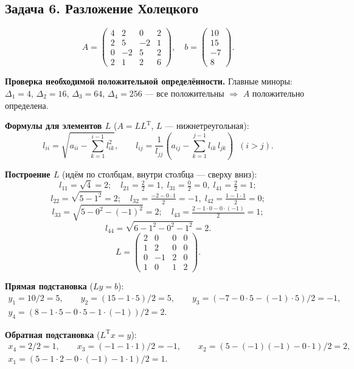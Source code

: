 \documentclass{article}
\begin{document}
\subsection*{Задача 6. Разложение Холецкого}
$$A = \begin{pmatrix} 4 & 2 & 0 & 2 \\ 2 & 5 & -2 & 1 \\ 0 & -2 & 5 & 2 \\ 2 & 1 & 2 & 6 \end{pmatrix}, \quad b = \begin{pmatrix} 10 \\ 15 \\ -7 \\ 8 \end{pmatrix}.$$

\textbf{Проверка необходимой положительной определённости.} Главные миноры: $\Delta_1=4$, $\Delta_2=16$, $\Delta_3=64$, $\Delta_4=256$ --- все положительны $\Rightarrow$ $A$ положительно определена.

\textbf{Формулы для элементов $L$} ($A = LL^\text{T}$, $L$ --- нижнетреугольная):
$$l_{ii} = \sqrt{a_{ii} - \sum_{k=1}^{i-1} l_{ik}^2}, \qquad l_{ij} = \frac{1}{l_{jj}}\left(a_{ij} - \sum_{k=1}^{j-1} l_{ik}\, l_{jk}\right) \;\; (i > j).$$

\textbf{Построение $L$} (идём по столбцам, внутри столбца --- сверху вниз):
$$l_{11} = \sqrt{4} = 2; \quad l_{21} = \tfrac{2}{2} = 1,\; l_{31} = \tfrac{0}{2} = 0,\; l_{41} = \tfrac{2}{2} = 1;$$
$$l_{22} = \sqrt{5 - 1^2} = 2; \quad l_{32} = \tfrac{-2 - 0\cdot 1}{2} = -1,\; l_{42} = \tfrac{1 - 1\cdot 1}{2} = 0;$$
$$l_{33} = \sqrt{5 - 0^2 - (-1)^2} = 2; \quad l_{43} = \tfrac{2 - 1\cdot 0 - 0\cdot(-1)}{2} = 1;$$
$$l_{44} = \sqrt{6 - 1^2 - 0^2 - 1^2} = 2.$$
$$L = \begin{pmatrix} 2 & 0 & 0 & 0 \\ 1 & 2 & 0 & 0 \\ 0 & -1 & 2 & 0 \\ 1 & 0 & 1 & 2 \end{pmatrix}.$$

\textbf{Прямая подстановка} ($Ly = b$):
$$\begin{aligned}
y_1 = 10/2 = 5, \qquad
y_2 = (15 - 1\cdot 5)/2 = 5, \qquad
y_3 = (-7 - 0\cdot 5 - (-1)\cdot 5)/2 = -1, \\
y_4 = (8 - 1\cdot 5 - 0\cdot 5 - 1\cdot(-1))/2 = 2.
\end{aligned}$$

\textbf{Обратная подстановка} ($L^\text{T}x = y$):
$$\begin{aligned}
x_4 = 2/2 = 1, \qquad
x_3 = (-1 - 1\cdot 1)/2 = -1, \qquad
x_2 = (5 - (-1)(-1) - 0\cdot 1)/2 = 2, \\
x_1 = (5 - 1\cdot 2 - 0\cdot(-1) - 1\cdot 1)/2 = 1.
\end{aligned}$$
\end{document}

